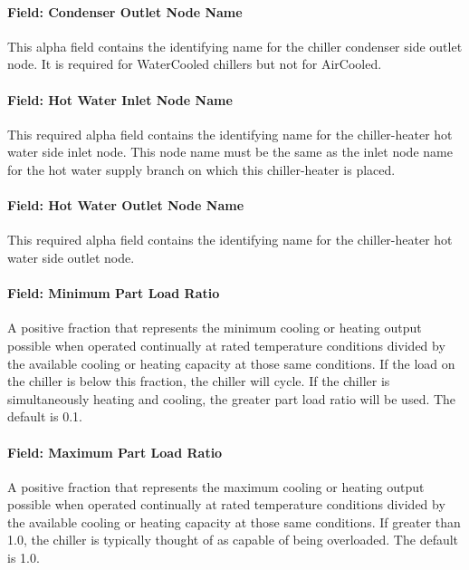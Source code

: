 \paragraph{Field: Condenser Outlet Node Name}\label{field-condenser-outlet-node-name-7}

This alpha field contains the identifying name for the chiller condenser side outlet node. It is required for WaterCooled chillers but not for AirCooled.

\paragraph{Field: Hot Water Inlet Node Name}\label{field-hot-water-inlet-node-name}

This required alpha field contains the identifying name for the chiller-heater hot water side inlet node. This node name must be the same as the inlet node name for the hot water supply branch on which this chiller-heater is placed.

\paragraph{Field: Hot Water Outlet Node Name}\label{field-hot-water-outlet-node-name}

This required alpha field contains the identifying name for the chiller-heater hot water side outlet node.

\paragraph{Field: Minimum Part Load Ratio}\label{field-minimum-part-load-ratio-7}

A positive fraction that represents the minimum cooling or heating output possible when operated continually at rated temperature conditions divided by the available cooling or heating capacity at those same conditions. If the load on the chiller is below this fraction, the chiller will cycle. If the chiller is simultaneously heating and cooling, the greater part load ratio will be used. The default is 0.1.

\paragraph{Field: Maximum Part Load Ratio}\label{field-maximum-part-load-ratio-7}

A positive fraction that represents the maximum cooling or heating output possible when operated continually at rated temperature conditions divided by the available cooling or heating capacity at those same conditions. If greater than 1.0, the chiller is typically thought of as capable of being overloaded. The default is 1.0.

